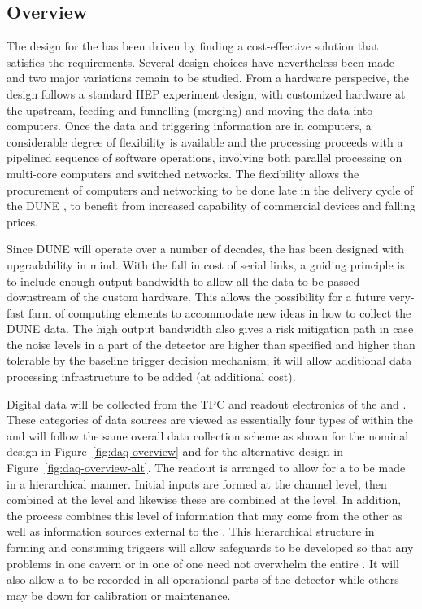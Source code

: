 \subsection{Overview}
\label{sec:fd-daq-overview}

The design for the  has been driven by finding a cost-effective solution that satisfies the requirements. Several design
choices have nevertheless been made and two major variations remain to
be studied. 
From a hardware perspecive, the  design follows a standard HEP
experiment design, with customized hardware at the upstream, feeding
and funnelling (merging) and moving the data into computers. 
Once the data and triggering information are in computers, a
considerable degree of flexibility is available and the processing
proceeds with a pipelined sequence of software operations, involving
both parallel processing on multi-core computers and switched
networks. The flexibility allows the procurement of computers and
networking to be done late in the delivery cycle of the DUNE
, to benefit from increased capability of commercial devices
and falling prices.

Since DUNE will operate over a number of decades, the  has been
designed with upgradability in mind. 
With the fall in cost of serial links, a guiding principle is to
include enough output bandwidth to allow all the data to be passed
downstream of the custom hardware.
This allows the possibility for a future very-fast farm of computing
elements to accommodate new ideas in how to collect the DUNE data. 
The high output bandwidth also gives a risk mitigation path in case
the noise levels in a part of the detector are higher than specified
and higher than tolerable by the baseline trigger decision mechanism;
it will allow additional data processing infrastructure to be added
(at additional cost).

Digital data will be collected from the TPC and 
readout electronics of the \single and \dual
{}. 
These categories of data sources are viewed as essentially four types
of  within the  and will follow the same overall
data collection scheme as shown for the nominal design in
Figure~\ref{fig:daq-overview} and for the alternative design in
Figure~\ref{fig:daq-overview-alt}. 
The readout is arranged to allow for a  to be made
in a hierarchical manner. 
Initial inputs are formed at the channel level, then combined at the
 level and likewise these are combined at the
 level.
In addition, the  process combines this level of
information that may come from the other  as well as
information sources external to the . 
This hierarchical structure in forming and consuming triggers will
allow safeguards to be developed so that any problems in one cavern or
in one  of one  need not overwhelm the
entire .
It will also allow a  to be recorded in all
operational parts of the detector while others may be down for
calibration or maintenance.

